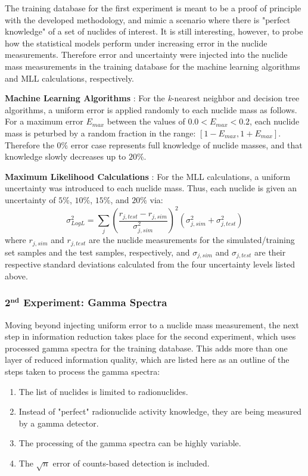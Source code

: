 The training database for the first experiment is meant to be a proof of
principle with the developed methodology, and mimic a scenario where there is
"perfect knowledge" of a set of nuclides of interest. It is still interesting,
however, to probe how the statistical models perform under increasing error in
the nuclide measurements. Therefore error and uncertainty were injected into
the nuclide mass measurements in the training database for the machine learning
algorithms and \gls{MLL} calculations, respectively. 

\noindent \textbf{Machine Learning Algorithms} : For the \textit{k}-nearest
neighbor and decision tree algorithms, a uniform error is applied randomly to
each nuclide mass as follows.  For a maximum error $E_{max}$ between the values
of $0.0 < E_{max} < 0.2$, each nuclide mass is peturbed by a random fraction in
the range: $[1-E_{max},1+E_{max}]$.  Therefore the $0\%$ error case represents
full knowledge of nuclide masses, and that knowledge slowly decreases up to
$20\%$. 

\noindent \textbf{Maximum Likelihood Calculations} : For the \gls{MLL}
calculations, a uniform uncertainty was introduced to each nuclide mass.  Thus,
each nuclide is given an uncertainty of $5\%$, $10\%$, $15\%$, and $20\%$
via:
\begin{equation}
  \label{eq:mllunc}
  \sigma_{Log L}^2 = \sum_j \left( 
                            \frac{r_{j,test} - r_{j,sim}}{\sigma_{j,sim}^2}
                            \right)^2 
                            (\sigma_{j,sim}^2 + \sigma_{j,test}^2)
\end{equation}
where $r_{j,sim}$ and $r_{j,test}$ are the nuclide measurements for the
simulated/training set samples and the test samples, respectively, and
$\sigma_{j,sim}$ and $\sigma_{j,test}$ are their respective standard
deviations calculated from the four uncertainty levels listed above.

\subsubsection{2$^{\mathbf{nd}}$ Experiment: Gamma Spectra}
\label{sec:gamerr}

Moving beyond injecting uniform error to a nuclide mass measurement, the next
step in information reduction takes place for the second experiment, which uses 
processed gamma spectra for the training database. This adds more than one layer of 
reduced information quality, which are listed here as an outline of the steps
taken to process the gamma spectra:
\begin{enumerate}
  \item \label{itm:1} The list of nuclides is limited to radionuclides.
  \item \label{itm:2} Instead of "perfect" radionuclide activity knowledge, 
        they are being measured by a gamma detector.
  \item \label{itm:3} The processing of the gamma spectra can be highly variable.
  \item \label{itm:4} The $\sqrt{n}$ error of counts-based detection is included. 
\end{enumerate}

